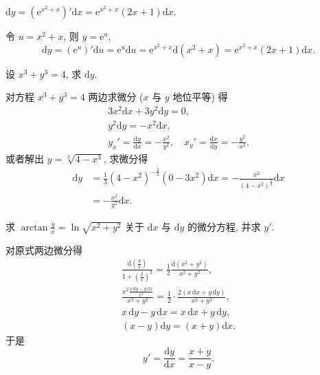 \begin{solution}[解法 1]
$\mathrm{d}y=(\mathrm{e}^{x^{2}+x})'\mathrm{d}x=\mathrm{e}^{x^{2}+x}(2x+1)\mathrm{d}x$.
\end{solution}

\begin{solution}[解法 2]
令 $u=x^{2}+x$, 则 $y=\mathrm{e}^{u}$,
\[
\mathrm{d}y=(\mathrm{e}^{u})'\mathrm{d}u=\mathrm{e}^{u}\mathrm{d}u
=\mathrm{e}^{x^{2}+x}\mathrm{d}(x^{2}+x)=\mathrm{e}^{x^{2}+x}(2x+1)\mathrm{d}x.
\]
\end{solution}

\begin{example}\label{ex:5.1.2}
设 $x^{3}+y^{3}=4$, 求 $\mathrm{d}y$.
\end{example}

\begin{solution}
对方程 $x^{3}+y^{3}=4$ 两边求微分 ($x$ 与 $y$ 地位平等) 得
\begin{gather*}
3x^{2}\mathrm{d}x+3y^{2}\mathrm{d}y=0,\\
y^{2}\mathrm{d}y=-x^{2}\mathrm{d}x,\\
y_{x}'=\frac{\mathrm{d}y}{\mathrm{d}x}=-\frac{x^{2}}{y^{2}},\quad
x_{y}'=\frac{\mathrm{d}x}{\mathrm{d}y}=-\frac{y^{2}}{x^{2}}.
\end{gather*}
或者解出 $y=\sqrt[3]{4-x^{3}}$, 求微分得
\begin{align*}
\mathrm{d}y&=\frac{1}{3}(4-x^{2})^{-\frac{2}{3}}(0-3x^{2})\mathrm{d}x=-\frac{x^{2}}{(4-x^{2})^{\frac{2}{3}}}\mathrm{d}x\\
&=-\frac{x^{2}}{y^{2}}\mathrm{d}x.
\end{align*}
\end{solution}

\begin{example}\label{ex:5.1.3}
求 $\arctan\frac{y}{x}=\ln\sqrt{x^{2}+y^{2}}$ 关于 $\mathrm{d}x$ 与 $\mathrm{d}y$ 的微分方程, 并求 $y'$.
\end{example}

\begin{solution}
对原式两边微分得
\begin{gather*}
\frac{\mathrm{d}\left(\frac{y}{x}\right)}{1+\left(\frac{y}{x}\right)^{2}}
=\frac{1}{2}\frac{\mathrm{d}(x^{2}+y^{2})}{x^{2}+y^{2}},\\
\frac{x^{2}\frac{x\,\mathrm{d}y-y\,\mathrm{d}x}{x^{2}}}{x^{2}+y^{2}}
=\frac{1}{2}\cdot\frac{2(x\,\mathrm{d}x+y\,\mathrm{d}y)}{x^{2}+y^{2}},\\
x\,\mathrm{d}y-y\,\mathrm{d}x=x\,\mathrm{d}x+y\,\mathrm{d}y,\\
(x-y)\mathrm{d}y=(x+y)\mathrm{d}x.
\end{gather*}
于是
\[
y'=\frac{\mathrm{d}y}{\mathrm{d}x}=\frac{x+y}{x-y}.
\]
\end{solution}

